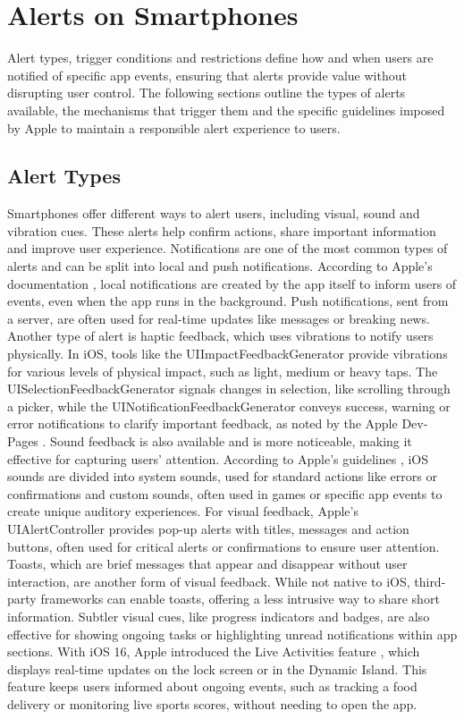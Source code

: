 \section{Alerts on Smartphones}
Alert types, trigger conditions and restrictions define how and when users are notified of specific app events, ensuring that alerts provide value without disrupting user control. 
The following sections outline the types of alerts available, the mechanisms that trigger them and the specific guidelines imposed by Apple to maintain a responsible alert experience to users.

\subsection{Alert Types}
Smartphones offer different ways to alert users, including visual, sound and vibration cues. 
These alerts help confirm actions, share important information and improve user experience.
Notifications are one of the most common types of alerts and can be split into local and push notifications. 
According to Apple's documentation \cite{apple_local_notifications}\cite{apple_push_notifications}, local notifications are created by the app itself to inform users of events, even when the app runs in the background. 
Push notifications, sent from a server, are often used for real-time updates like messages or breaking news.
Another type of alert is haptic feedback, which uses vibrations to notify users physically. 
In iOS, tools like the UIImpactFeedbackGenerator provide vibrations for various levels of physical impact, such as light, medium or heavy taps.
The UISelectionFeedbackGenerator signals changes in selection, like scrolling through a picker, while the UINotificationFeedbackGenerator conveys success, warning or error notifications to clarify important feedback, as noted by the Apple Dev-Pages \cite{apple_haptics}.
Sound feedback is also available and is more noticeable, making it effective for capturing users' attention.
According to Apple's guidelines \cite{apple_sound_guidelines}, iOS sounds are divided into system sounds, used for standard actions like errors or confirmations and custom sounds, often used in games or specific app events to create unique auditory experiences.
For visual feedback, Apple's UIAlertController \cite{apple_alerts} provides pop-up alerts with titles, messages and action buttons, often used for critical alerts or confirmations to ensure user attention. 
Toasts, which are brief messages that appear and disappear without user interaction, are another form of visual feedback. 
While not native to iOS, third-party frameworks can enable toasts, offering a less intrusive way to share short information. 
Subtler visual cues, like progress indicators and badges, are also effective for showing ongoing tasks or highlighting unread notifications within app sections.
With iOS 16, Apple introduced the Live Activities feature \cite{apple_live_activities}, which displays real-time updates on the lock screen or in the Dynamic Island. 
This feature keeps users informed about ongoing events, such as tracking a food delivery or monitoring live sports scores, without needing to open the app.


